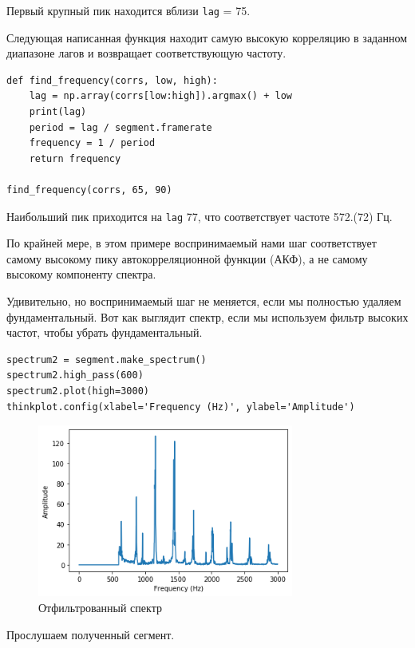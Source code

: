 \documentclass[a4paper,12pt]{report}
\begin{document}
Первый крупный пик находится вблизи \texttt{lag} = 75.

Следующая написанная функция находит самую высокую корреляцию в заданном диапазоне лагов и возвращает соответствующую частоту.

\begin{lstlisting}[caption=Функция find\_frequency]
def find_frequency(corrs, low, high):
    lag = np.array(corrs[low:high]).argmax() + low
    print(lag)
    period = lag / segment.framerate
    frequency = 1 / period
    return frequency
    
find_frequency(corrs, 65, 90)
\end{lstlisting}

Наибольший пик приходится на \texttt{lag} 77, что соответствует частоте 572.(72) Гц.

По крайней мере, в этом примере воспринимаемый нами шаг соответствует самому высокому пику автокорреляционной функции (АКФ), а не самому высокому компоненту спектра.

Удивительно, но воспринимаемый шаг не меняется, если мы полностью удаляем фундаментальный. Вот как выглядит спектр, если мы используем фильтр высоких частот, чтобы убрать фундаментальный.

\begin{lstlisting}[caption=Отфильтрованный спектр]
spectrum2 = segment.make_spectrum()
spectrum2.high_pass(600)
spectrum2.plot(high=3000)
thinkplot.config(xlabel='Frequency (Hz)', ylabel='Amplitude')
\end{lstlisting}

\begin{figure}[H]
        \centering
        \includegraphics[width=0.75\textwidth]{lab5_fig4_4.png}
        \caption{Отфильтрованный спектр}
        \label{fig:lab5_fig4_4}
\end{figure}

Прослушаем полученный сегмент.
\end{document}
